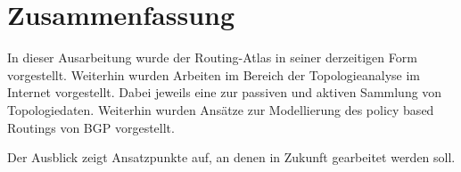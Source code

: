 \section{Zusammenfassung}\label{sec:schluss}

In dieser Ausarbeitung wurde der Routing-Atlas in seiner derzeitigen Form vorgestellt.
Weiterhin wurden Arbeiten im Bereich der Topologieanalyse im Internet vorgestellt.
Dabei jeweils eine zur passiven und aktiven Sammlung von Topologiedaten.
Weiterhin wurden Ansätze zur Modellierung des policy based Routings von BGP vorgestellt.

Der Ausblick zeigt Ansatzpunkte auf, an denen in Zukunft gearbeitet werden soll.
\newpage
